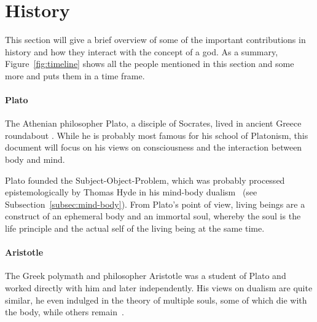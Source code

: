 \section{History}
\label{sec:History}

\begin{figure*}
    \caption[The Timeline]{Timeline of the presented persons. Those grayed out are left as a reference for other mentions in this document~\cite{wikimedia2021}. Rounded rectangles ( and ) denote the full life span of the respective person.}
    \label{fig:timeline}
\end{figure*}

This section will give a brief overview of some of the important contributions in history and how they interact with the concept of a god.
As a summary, Figure~\ref{fig:timeline} shows all the people mentioned in this section and some more and puts them in a time frame.

\paragraph{Plato}
The Athenian philosopher Plato, a disciple of Socrates, lived in ancient Greece roundabout .
While he is probably most famous for his school of Platonism, this document will focus on his views on consciousness and the interaction between body and mind.

Plato founded the Subject-Object-Problem, which was probably processed epistemologically by Thomas Hyde in his mind-body dualism~\cite{plato360} (see Subsection~\ref{subsec:mind-body}).
From Plato's point of view, living beings are a construct of an ephemeral body and an immortal soul, whereby the soul is the life principle and the actual self of the living being at the same time.


\paragraph{Aristotle}
The Greek polymath and philosopher Aristotle was a student of Plato and worked directly with him and later independently.
His views on dualism are quite similar, he even indulged in the theory of multiple souls, some of which die with the body, while others remain~\cite{aristotle350,hicks2015aristotle}.

